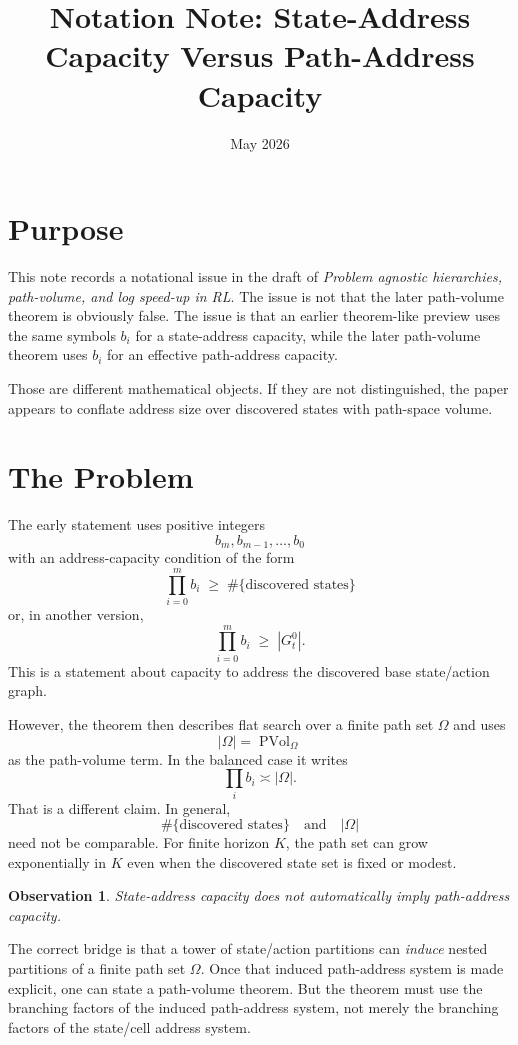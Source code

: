 \documentclass[11pt]{article}
\title{Notation Note: State-Address Capacity Versus Path-Address Capacity}
\author{}
\date{May 2026}
\newcommand{\PVol}{\operatorname{PVol}}
\newtheorem{observation}{Observation}
\begin{document}
\maketitle

\section*{Purpose}

This note records a notational issue in the draft of \emph{Problem agnostic hierarchies, path-volume, and log speed-up in RL}.  The issue is not that the later path-volume theorem is obviously false.  The issue is that an earlier theorem-like preview uses the same symbols \(b_i\) for a state-address capacity, while the later path-volume theorem uses \(b_i\) for an effective path-address capacity.

Those are different mathematical objects.  If they are not distinguished, the paper appears to conflate address size over discovered states with path-space volume.

\section*{The Problem}

The early statement uses positive integers
\[
    b_m,b_{m-1},\ldots,b_0
\]
with an address-capacity condition of the form
\[
    \prod_{i=0}^{m} b_i
    \;\ge\;
    \#\{\text{discovered states}\}
\]
or, in another version,
\[
    \prod_{i=0}^{m} b_i
    \;\ge\;
    |G_t^0|.
\]
This is a statement about capacity to address the discovered base state/action graph.

However, the theorem then describes flat search over a finite path set \(\Omega\) and uses
\[
    |\Omega|
    =
    \PVol_\Omega
\]
as the path-volume term.  In the balanced case it writes
\[
    \prod_i b_i \asymp |\Omega|.
\]
That is a different claim.  In general,
\[
    \#\{\text{discovered states}\}
    \quad\text{and}\quad
    |\Omega|
\]
need not be comparable.  For finite horizon \(K\), the path set can grow exponentially in \(K\) even when the discovered state set is fixed or modest.

\begin{observation}
State-address capacity does not automatically imply path-address capacity.
\end{observation}

The correct bridge is that a tower of state/action partitions can \emph{induce} nested partitions of a finite path set \(\Omega\).  Once that induced path-address system is made explicit, one can state a path-volume theorem.  But the theorem must use the branching factors of the induced path-address system, not merely the branching factors of the state/cell address system.
\end{document}
